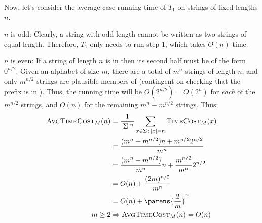 \begin{Answer}
  \step
  Now, let's consider the average-case running time of $T_1$
  on strings of fixed lengths $n$.
  \begin{enumroman}
    \item $n$ is odd:
      Clearly, a string with odd length cannot be written as two strings of equal length.
      Therefore, $T_1$ only needs to run step $1$, which
      takes $O(n)$ time.
    \item $n$ is even:
      If a string of length $n$ is in \WSAT
      then its second half must be of the form $0^{n/2}$.
      Given an alphabet of size $m$, there are a total of $m^{n}$ strings of length $n$,
      and only $m^{n/2}$ strings are plausible members of \WSAT
      (contingent on checking that the prefix is in \SAT).
      Thus, the running time will be $O(2^{n/2}) = O(2^n)$ for \emph{each} of the $m^{n/2}$ strings,
      and $O(n)$ for the remaining $m^n - m^{n/2}$ strings.
      Thus;
      \begin{align*}
        \AvgTCost(n) &= \frac{1}{\abs{\Sigma}^n} \sum_{x \in \Sigma \,:\, \abs{x} = n} \TCost(x) \\
        &= \frac{(m^n - m^{n/2}) n + m^{n/2} 2^{n/2}}{m^n}  \\
        &= \frac{(m^n - m^{n/2})}{m^n} n + \frac{m^{n/2}}{m^n} 2^{n/2} \\ 
        &= O(n) + \frac{(2m)^{n/2}}{m^n} \\
        &= O(n) + \parens{\frac{2}{m}}^n \\
        m \ge 2 &\Rightarrow \AvgTCost(n) = O(n)
      \end{align*}
  \end{enumroman}
\end{Answer}
